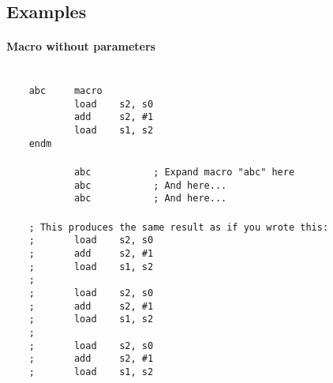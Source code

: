     \clearpage
    \subsection{Examples}
        \paragraph{Macro without parameters}
            ~\\
            \verb'    abc     macro'\\
            \verb'            load    s2, s0'\\
            \verb'            add     s2, #1'\\
            \verb'            load    s1, s2'\\
            \verb'    endm'\\
            \verb''\\
            \verb'            abc           ; Expand macro "abc" here'\\
            \verb'            abc           ; And here...'\\
            \verb'            abc           ; And here...'\\
            \verb''\\
            \verb'    ; This produces the same result as if you wrote this:'\\
            \verb'    ;       load    s2, s0'\\
            \verb'    ;       add     s2, #1'\\
            \verb'    ;       load    s1, s2'\\
            \verb'    ;'\\
            \verb'    ;       load    s2, s0'\\
            \verb'    ;       add     s2, #1'\\
            \verb'    ;       load    s1, s2'\\
            \verb'    ;'\\
            \verb'    ;       load    s2, s0'\\
            \verb'    ;       add     s2, #1'\\
            \verb'    ;       load    s1, s2'\\

